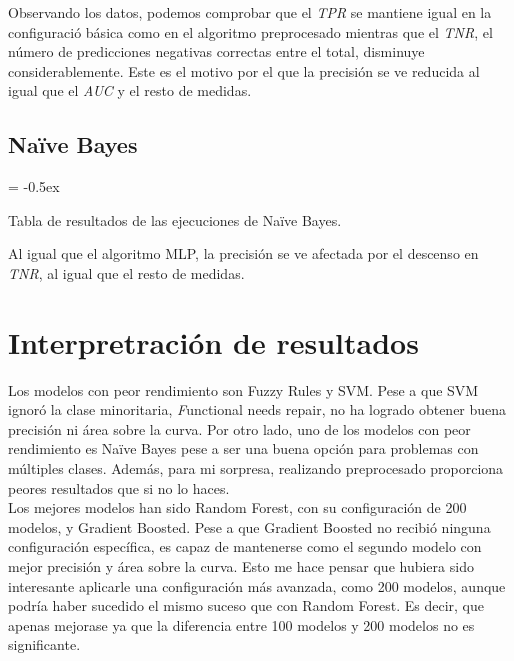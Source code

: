 \documentclass[paper=a4, fontsize=12pt]{article} %
\numberwithin{equation}{section} %
\numberwithin{figure}{section} %
\numberwithin{table}{section} %
\begin{document}
Observando los datos, podemos comprobar que el \textit{TPR} se mantiene igual en la configuració básica como en el algoritmo preprocesado mientras que el \textit{TNR}, el número de predicciones negativas correctas entre el total, disminuye considerablemente. Este es el motivo por el que la precisión se ve reducida al igual que el \textit{AUC} y el resto de medidas. 

\subsection {Naïve Bayes}

	\extrarowheight = -0.5ex %
	\renewcommand{\arraystretch}{1.75} %
	\begin{table}[H]
		\begin{center}
		\end{center}
		\caption {Tabla de resultados de las ejecuciones de Naïve Bayes.}
		\label {BYComparation}
	\end{table}

Al igual que el algoritmo MLP, la precisión se ve afectada por el descenso en \textit{TNR}, al igual que el resto de medidas.


\section{Interpretración de resultados}

Los modelos con peor rendimiento son Fuzzy Rules y SVM. Pese a que SVM ignoró la clase minoritaria, \textit Functional needs repair, no ha logrado obtener buena precisión ni área sobre la curva. Por otro lado, uno de los modelos con peor rendimiento es Naïve Bayes pese a ser una buena opción para problemas con múltiples clases. Además, para mi sorpresa, realizando preprocesado proporciona peores resultados que si no lo haces. \\

Los mejores modelos han sido Random Forest, con su configuración de 200 modelos, y Gradient Boosted. Pese a que Gradient Boosted no recibió ninguna configuración específica, es capaz de mantenerse como el segundo modelo con mejor precisión y área sobre la curva. Esto me hace pensar que hubiera sido interesante aplicarle una configuración más avanzada, como 200 modelos, aunque podría haber sucedido el mismo suceso que con Random Forest. Es decir, que apenas mejorase ya que la diferencia entre 100 modelos y 200 modelos no es significante. \\
\end{document}
